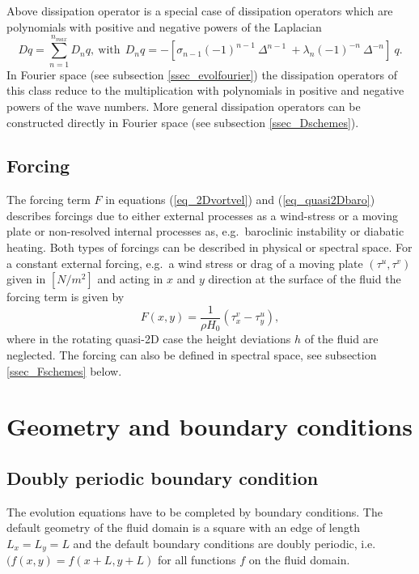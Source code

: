 Above dissipation operator is a special case of dissipation operators 
which are polynomials with positive and negative powers of the Laplacian
\begin{equation} \label{eq_Laplace_dissip_poly}
  D q = \sum_{n = 1}^{n_{max}} D_{n} q,
  \ \mbox{with} \ \
  D_{n} q 
   = 
 -\left[
   \sigma_{n-1} \left(-1 \right)^{n-1} \ \Delta^{n-1}
   \ +
   \lambda_{n} \left(-1 \right)^{-n} \ \Delta^{-n}
  \right] \ q.
\end{equation}
In Fourier space (see subsection \ref{ssec_evolfourier}) the dissipation 
operators of this class reduce to the multiplication with polynomials 
in positive and negative powers of the wave numbers. More general 
dissipation operators can be constructed directly in Fourier space 
(see subsection \ref{ssec_Dschemes}).

\subsection{Forcing}
The forcing term $F$ in equations (\ref{eq_2Dvortvel}) and 
(\ref{eq_quasi2Dbaro}) describes forcings due to either 
external processes as a wind-stress or a moving plate or
non-resolved internal processes as, e.g.\ baroclinic instability 
or diabatic heating. Both types of forcings can be described 
in physical or spectral space. For a constant external forcing, 
e.g.\ a wind stress or drag of a moving plate $(\tau^{u},\tau^{v})$ 
given in $[N/m^{2}]$ and acting in $x$ and $y$ direction at the surface 
of the fluid the forcing term is given by 
\begin{equation} \label{eq_Fstressdrag}
 F(x,y) = \frac{1}{\rho H_{0}} \left( \tau_{x}^{v} - \tau_{y}^{u} \right),
\end{equation}
where in the rotating quasi-2D case the height deviations $h$ of the
fluid are neglected. The forcing can also be defined in spectral
space, see subsection \ref{ssec_Fschemes} below.
\section{Geometry and boundary conditions}
%
\subsection{Doubly periodic boundary condition}
%
The evolution equations have to be completed by boundary conditions.  
The default geometry of the fluid domain is a square with an edge of length
$L_{x} = L_{y} = L$ and the default boundary conditions are doubly periodic,  
i.e.\ $(f(x,y) = f(x+L,y+L)$ for all functions $f$ on the fluid domain.
%
